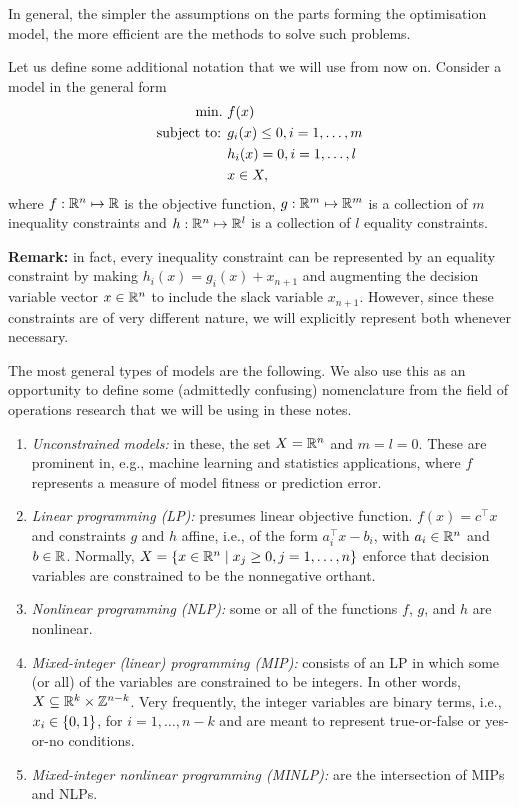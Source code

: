\documentclass{article}
\begin{document}
In general, the simpler the assumptions on the parts forming the optimisation model, the more efficient are the methods to solve such problems. 

Let us define some additional notation that we will use from now on. Consider a model in the general form
%
\begin{align*}
	\mathop{\text{min.} \ } & f(x) \\
	\mbox{subject to: }   & g_i(x) \leq 0, i = 1, \dots, m \\
	      & h_i(x) = 0, i = 1, \dots, l \\
	      & x \in X,  
\end{align*}
%
where $f: \mathbb R^n \mapsto \mathbb R$ is the objective function, $g:\mathbb R^m \mapsto \mathbb R^m$ is a collection of $m$ inequality constraints and $h: \mathbb R^n \mapsto \mathbb R^l$ is a collection of $l$ equality constraints.

{\bf Remark:} in fact, every inequality constraint can be represented by an equality constraint by making $h_i(x) = g_i(x) + x_{n+1}$ and augmenting the decision variable vector $x \in \mathbb R^n$ to include the slack variable $x_{n+1}$. However, since these constraints are of very different nature, we will explicitly represent both whenever necessary.

The most general types of models are the following. We also use this as an opportunity to define some (admittedly confusing) nomenclature from the field of operations research that we will be using in these notes.
%
\begin{enumerate}
    \item \emph{Unconstrained models:} in these, the set $X = \mathbb R^n$ and $m=l=0$. These are prominent in, e.g., machine learning and statistics applications, where $f$ represents a measure of model fitness or prediction error.  
    \item \emph{Linear programming (LP):} presumes linear objective function. $f(x) = c^\top x$ and constraints $g$ and $h$ affine, i.e., of the form $a_i^\top x - b_i$, with $a_i \in \mathbb R^n$ and $b \in \mathbb R$. Normally, $X = \left\{ x \in \mathbb R^n \mid x_j \geq 0, j = 1,\dots, n \right \}$ enforce that decision variables are constrained to be the nonnegative orthant.
    \item \emph{Nonlinear programming (NLP):} some or all of the functions $f$, $g$, and $h$ are nonlinear.
    \item \emph{Mixed-integer (linear) programming (MIP):} consists of an LP in which some (or all) of the variables are constrained to be integers. In other words, $X \subseteq \mathbb R^k \times \mathbb Z^{n-k}$. Very frequently, the integer variables are binary terms, i.e., $x_i \in \left\{ 0,1 \right \}$, for $i = 1,\dots, n-k$ and are meant to represent true-or-false or yes-or-no conditions.
    \item \emph{Mixed-integer nonlinear programming (MINLP):} are the intersection of MIPs and NLPs.  
\end{enumerate}
\end{document}
